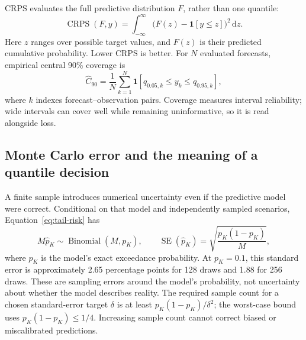 \documentclass[11pt,a4paper]{article}
\begin{document}
CRPS evaluates the full predictive distribution \(F\), rather than one quantile:
\begin{equation}
\operatorname{CRPS}(F,y)=\int_{-\infty}^{\infty}\bigl(F(z)-\mathbf{1}[y\le z]\bigr)^2\,\mathrm{d}z.
\label{eq:crps}
\end{equation}
Here \(z\) ranges over possible target values, and \(F(z)\) is their predicted cumulative probability. Lower CRPS is better. For \(N\) evaluated forecasts, empirical central 90\% coverage is
\begin{equation}
\widehat C_{90}=\frac{1}{N}\sum_{k=1}^{N}\mathbf{1}[q_{0.05,k}\le y_k\le q_{0.95,k}],
\label{eq:coverage}
\end{equation}
where \(k\) indexes forecast--observation pairs. Coverage measures interval reliability; wide intervals can cover well while remaining uninformative, so it is read alongside loss.


\subsection{Monte Carlo error and the meaning of a quantile decision}
\label{sec:mc-error}
A finite sample introduces numerical uncertainty even if the predictive model were correct. Conditional on that model and independently sampled scenarios, Equation~\eqref{eq:tail-risk} has
\begin{equation}
M\widehat p_K\sim\operatorname{Binomial}(M,p_K),\qquad
\operatorname{SE}(\widehat p_K)=\sqrt{\frac{p_K(1-p_K)}{M}},
\label{eq:mc-error}
\end{equation}
where \(p_K\) is the model's exact exceedance probability. At \(p_K=0.1\), this standard error is approximately 2.65 percentage points for 128 draws and 1.88 for 256 draws. These are sampling errors around the model's probability, not uncertainty about whether the model describes reality. The required sample count for a chosen standard-error target \(\delta\) is at least \(p_K(1-p_K)/\delta^2\); the worst-case bound uses \(p_K(1-p_K)\le1/4\). Increasing sample count cannot correct biased or miscalibrated predictions.
\end{document}
